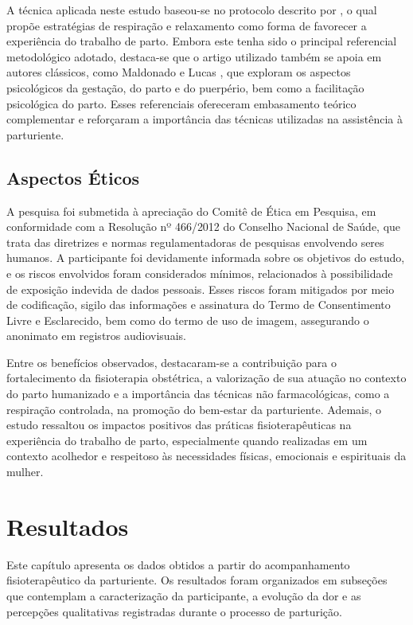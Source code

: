 \documentclass[openright]{tex/estilos/normas-utf-tex}
\begin{document}
A técnica aplicada neste estudo baseou-se no protocolo descrito por , o qual propõe estratégias de respiração e relaxamento como forma de favorecer a experiência do trabalho de parto. Embora este tenha sido o principal referencial metodológico adotado, destaca-se que o artigo utilizado também se apoia em autores clássicos, como Maldonado \citeyear{maldonado1991} e Lucas \citeyear{lucas1983}, que exploram os aspectos psicológicos da gestação, do parto e do puerpério, bem como a facilitação psicológica do parto. Esses referenciais ofereceram embasamento teórico complementar e reforçaram a importância das técnicas utilizadas na assistência à parturiente.

\section{Aspectos Éticos}
\label{sec:etica}

A pesquisa foi submetida à apreciação do Comitê de Ética em Pesquisa, em conformidade com a Resolução nº 466/2012 do Conselho Nacional de Saúde, que trata das diretrizes e normas regulamentadoras de pesquisas envolvendo seres humanos. A participante foi devidamente informada sobre os objetivos do estudo, e os riscos envolvidos foram considerados mínimos, relacionados à possibilidade de exposição indevida de dados pessoais. Esses riscos foram mitigados por meio de codificação, sigilo das informações e assinatura do Termo de Consentimento Livre e Esclarecido, bem como do termo de uso de imagem, assegurando o anonimato em registros audiovisuais.

Entre os benefícios observados, destacaram-se a contribuição para o fortalecimento da fisioterapia obstétrica, a valorização de sua atuação no contexto do parto humanizado e a importância das técnicas não farmacológicas, como a respiração controlada, na promoção do bem-estar da parturiente. Ademais, o estudo ressaltou os impactos positivos das práticas fisioterapêuticas na experiência do trabalho de parto, especialmente quando realizadas em um contexto acolhedor e respeitoso às necessidades físicas, emocionais e espirituais da mulher.

\chapter{Resultados}
\label{chap:resultados}

Este capítulo apresenta os dados obtidos a partir do acompanhamento fisioterapêutico da parturiente. Os resultados foram organizados em subseções que contemplam a caracterização da participante, a evolução da dor e as percepções qualitativas registradas durante o processo de parturição.
\end{document}
